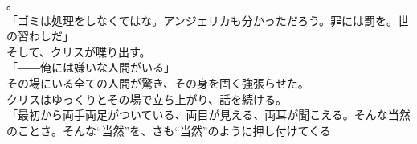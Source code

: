 \documentclass[b5j,10pt,openany]{jsbook}
\begin{document}
。\\「ゴミは処理をしなくてはな。アンジェリカも分かっただろう。罪には罰を。世の習わしだ」\\そして、クリスが喋り出す。\\「――俺には嫌いな人間がいる」\\その場にいる全ての人間が驚き、その身を固く強張らせた。\\クリスはゆっくりとその場で立ち上がり、話を続ける。\\「最初から両手両足がついている、両目が見える、両耳が聞こえる。そんな当然のことさ。そんな``当然''を、さも``当然''のように押し付けてくる
\end{document}

